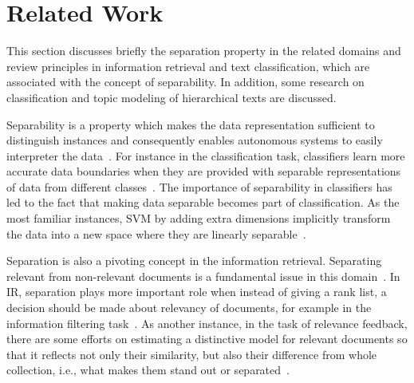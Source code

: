 \section{Related Work}
This section discusses briefly the separation property in the related domains and review principles in information retrieval and text classification, which are associated with the concept of separability.  
In addition, some research on classification and topic modeling of hierarchical texts are discussed. 

Separability is a property which makes the data representation sufficient to distinguish instances and consequently enables autonomous systems to easily interpreter the data~\citep{Lewis:1992}. For instance in the classification task, classifiers learn more accurate data boundaries when they are provided with separable representations of data from different classes~\citep{Lewis:1995}. The importance of separability in classifiers has led to the fact that making data separable becomes part of classification. As the most familiar instances, SVM by adding extra dimensions implicitly transform the data into a new space where they are linearly separable~\citep{Burges:1998}.

Separation is also a pivoting concept in the information retrieval. Separating relevant from non-relevant documents is a fundamental issue in this domain~\citep{Robertson:1977,saracevic:1975,Lavrenko:2001}. In IR, separation plays more important role when instead of giving a rank list, a decision should be made about relevancy of documents, for example in the information filtering task~\citep{Lewis:1992}. As another instance, in the task of relevance feedback, there are some efforts on estimating a distinctive model for relevant documents so that it reflects not only  their similarity, but also their difference from whole collection, i.e., what makes them stand out or separated~\citep{Sparck:2003,Hiemstra:2004,Zhai:SMM:2001}. 

